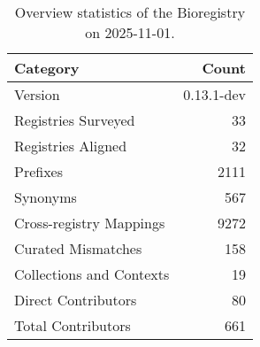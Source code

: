 \begin{table}
\caption{Overview statistics of the Bioregistry on 2025-11-01.}
\label{tab:bioregistry-summary}
\begin{tabular}{lr}
\toprule
Category & Count \\
\midrule
Version & 0.13.1-dev \\
Registries Surveyed & 33 \\
Registries Aligned & 32 \\
Prefixes & 2111 \\
Synonyms & 567 \\
Cross-registry Mappings & 9272 \\
Curated Mismatches & 158 \\
Collections and Contexts & 19 \\
Direct Contributors & 80 \\
Total Contributors & 661 \\
\bottomrule
\end{tabular}
\end{table}
